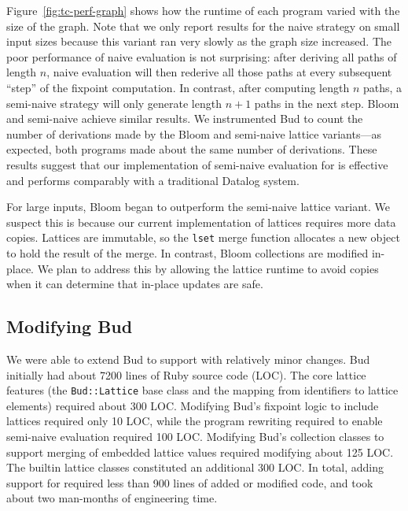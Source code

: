 Figure~\ref{fig:tc-perf-graph} shows how the runtime of each program varied with
the size of the graph. Note that we only report results for the naive \lang
strategy on small input sizes because this variant ran very slowly as the graph
size increased. The poor performance of naive evaluation is not surprising:
after deriving all paths of length $n$, naive evaluation will then rederive all
those paths at every subsequent ``step'' of the fixpoint computation. In
contrast, after computing length $n$ paths, a semi-naive strategy will only
generate length $n+1$ paths in the next step. Bloom and semi-naive \lang achieve
similar results. We instrumented Bud to count the number of derivations made by
the Bloom and semi-naive lattice variants---as expected, both programs made about
the same number of derivations. These results suggest that our implementation of
semi-naive evaluation for \lang is effective and performs comparably with a
traditional Datalog system.

For large inputs, Bloom began to outperform the semi-naive lattice variant. We
suspect this is because our current implementation of lattices requires more
data copies. Lattices are immutable, so the \texttt{lset} merge function
allocates a new object to hold the result of the merge. In contrast, Bloom
collections are modified in-place. We plan to address this by allowing the
lattice runtime to avoid copies when it can determine that in-place updates are
safe.

\subsection{Modifying Bud}
We were able to extend Bud to support \lang with relatively minor changes. Bud
initially had about 7200 lines of Ruby source code (LOC). The core lattice
features (the \texttt{Bud::Lattice} base class and the mapping from identifiers
to lattice elements) required about 300 LOC. Modifying Bud's fixpoint logic to
include lattices required only 10 LOC, while the program rewriting required to
enable semi-naive evaluation required 100 LOC. Modifying Bud's collection
classes to support merging of embedded lattice values required modifying about
125 LOC. The builtin lattice classes constituted an additional 300 LOC. In
total, adding support for \lang required less than 900 lines of added or
modified code, and took about two man-months of engineering time.%

